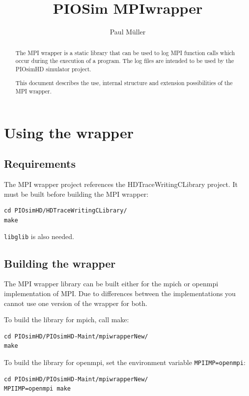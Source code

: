 \documentclass[a4paper,12pt,pdftex]{scrartcl}
\title{PIOSim MPIwrapper}
\author{Paul Müller}
\begin{document}
\maketitle

\begin{abstract}
  The MPI wrapper is a static library that can be used to log MPI
  function calls which occur during the execution of a program. The
  log files are intended to be used by the PIOsimHD simulator project.

  This document describes the use, internal structure and extension
  possibilities of the MPI wrapper.
\end{abstract}

\tableofcontents

\section{Using the wrapper}

\subsection{Requirements}

The MPI wrapper project references the HDTraceWritingCLibrary
project. It must be built before building the MPI wrapper:
\begin{lstlisting}
cd PIOsimHD/HDTraceWritingCLibrary/
make
\end{lstlisting}

\verb/libglib/ is also needed.

\subsection{Building the wrapper}

The MPI wrapper library can be built either for the mpich or openmpi
implementation of MPI. Due to differences between the implementations
you cannot use one version of the wrapper for both.

To build the library for mpich, call make:
\begin{lstlisting}
cd PIOsimHD/PIOsimHD-Maint/mpiwrapperNew/
make
\end{lstlisting}

To build the library for openmpi, set the environment variable
\lstinline|MPIIMP=openmpi|:
\begin{lstlisting}
cd PIOsimHD/PIOsimHD-Maint/mpiwrapperNew/
MPIIMP=openmpi make
\end{lstlisting}
\end{document}
